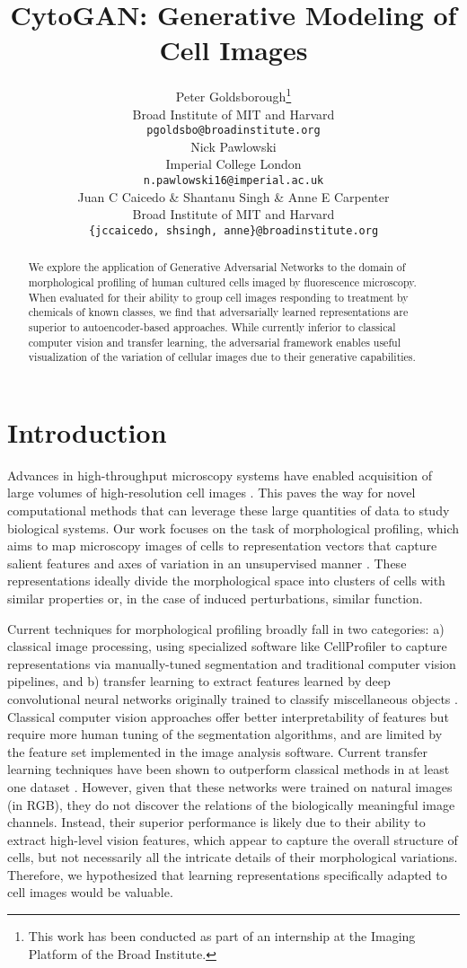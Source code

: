 \documentclass{article}
\title{CytoGAN: Generative Modeling of Cell Images}
\author{
  Peter Goldsborough\thanks{This work has been conducted as part of an internship at the Imaging Platform of the Broad Institute.}\\
  Broad Institute of MIT and Harvard \\
  \texttt{pgoldsbo@broadinstitute.org} \\
  \And
  Nick Pawlowski \\
  Imperial College London \\
  \texttt{n.pawlowski16@imperial.ac.uk} \\
  \AND
  Juan C Caicedo \& Shantanu Singh \& Anne E Carpenter\\
  Broad Institute of MIT and Harvard \\
  \texttt{\{jccaicedo, shsingh, anne\}@broadinstitute.org} \\
}
\begin{document}
\maketitle

\begin{abstract}
We explore the application of Generative Adversarial Networks to the domain of morphological profiling of human cultured cells imaged by fluorescence microscopy. When evaluated for their ability to group cell images responding to treatment by chemicals of known classes, we find that adversarially learned representations are superior to autoencoder-based approaches. While currently inferior to classical computer vision and transfer learning, the adversarial framework enables useful visualization of the variation of cellular images due to their generative capabilities.
\end{abstract}

\section{Introduction}
Advances in high-throughput microscopy systems have enabled acquisition of large volumes of high-resolution cell images \cite{caicedo2017data}. This paves the way for novel computational methods that can leverage these large quantities of data to study biological systems. Our work focuses on the task of morphological profiling, which aims to map microscopy images of cells to representation vectors that capture salient features and axes of variation in an unsupervised manner \cite{caicedo_profiling}. These representations ideally divide the morphological space into clusters of cells with similar properties or, in the case of induced perturbations, similar function.

Current techniques for morphological profiling broadly fall in two categories: a) classical image processing, using specialized software like CellProfiler \cite{Carpenter2006} to capture representations via manually-tuned segmentation and traditional computer vision pipelines, and b) transfer learning to extract features learned by deep convolutional neural networks originally trained to classify miscellaneous objects \cite{pawlowski2016automating, ando2017improving}. Classical computer vision approaches offer better interpretability of features but require more human tuning of the segmentation algorithms, and are limited by the feature set implemented in the image analysis software. Current transfer learning techniques have been shown to outperform classical methods in at least one dataset \cite{pawlowski2016automating,ando2017improving}. However, given that these networks were trained on natural images (in RGB), they do not discover the relations of the biologically meaningful image channels. Instead, their superior performance is likely due to their ability to extract high-level vision features, which appear to capture the overall structure of cells, but not necessarily all the intricate details of their morphological variations. Therefore, we hypothesized that learning representations specifically adapted to cell images would be valuable.
\end{document}

